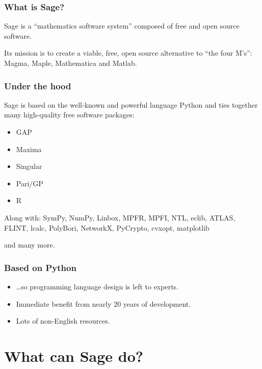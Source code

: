 \documentclass{beamer}
\newcommand{\blankline}{\vspace{\baselineskip}}
\begin{document}
\begin{frame}
  \frametitle{What is Sage?}
  
  Sage is a ``mathematics software system'' composed of free and open
  source software.

  \pause \blankline

  Its mission is to create a viable, free, open source alternative to
  ``the four M's'': Magma, Maple, Mathematica and Matlab.

\end{frame}

\begin{frame}
  \frametitle{Under the hood}
  
  Sage is based on the well-known and powerful language Python and ties
  together many high-quality free software packages:

  \begin{itemize}
  \item GAP
  \pause
  \item Maxima
  \pause
  \item Singular
  \pause
  \item Pari/GP
  \pause
  \item R
  \end{itemize}

\pause Along with:
\pause SymPy,
\pause NumPy,
\pause Linbox,
\pause MPFR,
\pause MPFI,
\pause NTL,
\pause eclib,
\pause ATLAS,
\pause FLINT,
\pause lcalc,
\pause PolyBori,
\pause NetworkX,
\pause PyCrypto,
\pause cvxopt,
\pause matplotlib

\pause \blankline

and many more.

\end{frame}

\begin{frame}
  \frametitle{Based on Python}
  
  \begin{itemize}
  \item \ldots so programming language design is left to experts.
  \pause
  \item Immediate benefit from nearly 20 years of development.
  \pause
  \item Lots of non-English resources.
  \end{itemize}

\end{frame}

\section{What can Sage do?}
\end{document}
